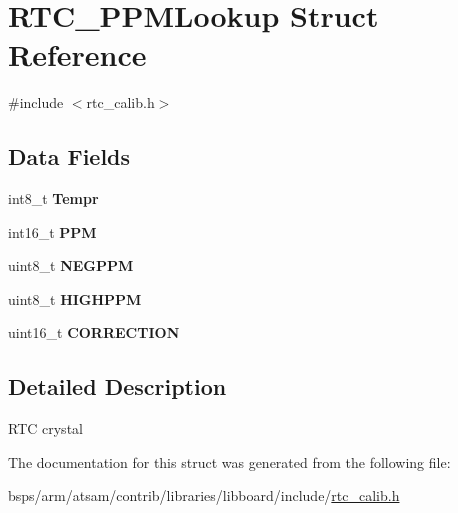 \hypertarget{structRTC__PPMLookup}{}\section{R\+T\+C\+\_\+\+P\+P\+M\+Lookup Struct Reference}
\label{structRTC__PPMLookup}


{\ttfamily \#include $<$rtc\+\_\+calib.\+h$>$}

\subsection*{Data Fields}
\begin{DoxyCompactItemize}
\item 
\mbox{\label{structRTC__PPMLookup_a9f6826a6d0c489df6c476da80a92340e}} 
int8\+\_\+t {\bfseries Tempr}
\item 
\mbox{\label{structRTC__PPMLookup_a0450d0a7485d36b7a1839e1303ddda72}} 
int16\+\_\+t {\bfseries P\+PM}
\item 
\mbox{\label{structRTC__PPMLookup_a2aa73e4955e73ff54b6629f6c81c1e2e}} 
uint8\+\_\+t {\bfseries N\+E\+G\+P\+PM}
\item 
\mbox{\label{structRTC__PPMLookup_a3c266942c96c15df57ca0791a10c35e2}} 
uint8\+\_\+t {\bfseries H\+I\+G\+H\+P\+PM}
\item 
\mbox{\label{structRTC__PPMLookup_aae3d10e7d08aad44ba157b25828c8466}} 
uint16\+\_\+t {\bfseries C\+O\+R\+R\+E\+C\+T\+I\+ON}
\end{DoxyCompactItemize}


\subsection{Detailed Description}
R\+TC crystal 

The documentation for this struct was generated from the following file\+:\begin{DoxyCompactItemize}
\item 
bsps/arm/atsam/contrib/libraries/libboard/include/\mbox{\hyperlink{rtc__calib_8h}{rtc\+\_\+calib.\+h}}\end{DoxyCompactItemize}
